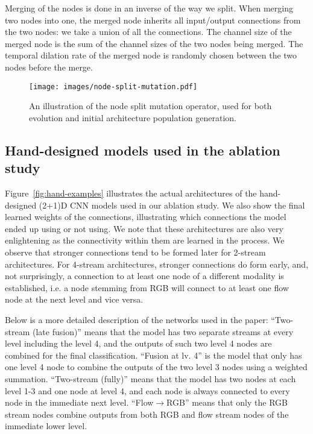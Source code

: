 \documentclass{article} \usepackage{iclr2020_conference,times}
\begin{document}
Merging of the nodes is done in an inverse of the way we split. When merging two nodes into one, the merged node inherits all input/output connections from the two nodes: we take a union of all the connections. The channel size of the merged node is the sum of the channel sizes of the two nodes being merged. The temporal dilation rate of the merged node is randomly chosen between the two nodes before the merge.




\begin{figure}
  \centering
   \texttt{[image: images/node-split-mutation.pdf]}\caption{An illustration of the node split mutation operator, used for both evolution and initial architecture population generation.}
  \label{fig:node-split}
\end{figure}


\subsection{Hand-designed models used in the ablation study}

Figure~\ref{fig:hand-examples} illustrates the actual architectures of the hand-designed (2+1)D CNN models used in our ablation study. We also show the final learned weights of the connections, illustrating which connections the model ended up using or not using. We note that these architectures are also very enlightening as the connectivity within them are learned in the process. We observe that stronger connections tend to be formed later for 2-stream architectures. For 4-stream architectures, stronger connections do form early, and, not surprisingly, a connection to at least one node of a different modality is established, i.e. a node stemming from RGB will connect to at least one flow node at the next level and vice versa.

Below is a more detailed description of the networks used in the paper:
``Two-stream (late fusion)'' means that the model has two separate streams at every level including the level 4, and the outputs of such two level 4 nodes are combined for the final classification. ``Fusion at lv. 4'' is the model that only has one level 4 node to combine the outputs of the two level 3 nodes using a weighted summation. ``Two-stream (fully)'' means that the model has two nodes at each level 1-3 and one node at level 4, and each node is always connected to every node in the immediate next level. ``Flow$\rightarrow$RGB'' means that only the RGB stream nodes combine outputs from both RGB and flow stream nodes of the immediate lower level.
\end{document}
